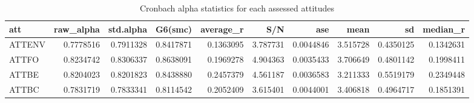 \begin{table}

\caption{Cronbach alpha statistics for each assessed attitudes}
\centering
\begin{tabular}[t]{lrrrrrrrrr}
\toprule
att & raw\_alpha & std.alpha & G6(smc) & average\_r & S/N & ase & mean & sd & median\_r\\
\midrule
ATTENV & 0.7778516 & 0.7911328 & 0.8417871 & 0.1363095 & 3.787731 & 0.0044846 & 3.515728 & 0.4350125 & 0.1342631\\
ATTFO & 0.8234742 & 0.8306337 & 0.8638091 & 0.1969278 & 4.904363 & 0.0035433 & 3.706649 & 0.4801142 & 0.1998411\\
ATTBE & 0.8204023 & 0.8201823 & 0.8438880 & 0.2457379 & 4.561187 & 0.0036583 & 3.211333 & 0.5519179 & 0.2349448\\
ATTBC & 0.7831719 & 0.7833341 & 0.8114542 & 0.2052409 & 3.615401 & 0.0044001 & 3.406818 & 0.4964717 & 0.1851391\\
\bottomrule
\end{tabular}
\end{table}
